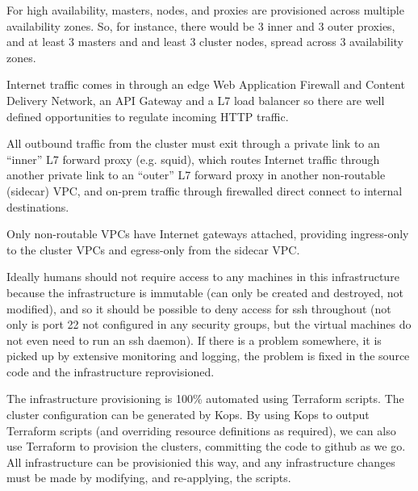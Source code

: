 \documentclass[reprint,amsmath,amssymb,aps]{revtex4-1}
\begin{document}
For high availability, masters, nodes, and proxies are provisioned across multiple availability zones. So, for instance, there would be 3 inner and 3 outer proxies, and at least 3 masters and and least 3 cluster nodes, spread across 3 availability zones.

Internet traffic comes in through an edge Web Application Firewall and Content Delivery Network, an API Gateway and a L7 load balancer so there are well defined opportunities to regulate incoming HTTP traffic.

All outbound traffic from the cluster must exit through a private link to an “inner” L7 forward proxy (e.g. squid), which routes Internet traffic through another private link to an “outer” L7 forward proxy in another non-routable (sidecar) VPC, and on-prem traffic through firewalled direct connect to internal destinations.

Only non-routable VPCs have Internet gateways attached, providing ingress-only to the cluster VPCs and egress-only from the sidecar VPC.

Ideally humans should not require access to any machines in this infrastructure because the infrastructure is immutable (can only be created and destroyed, not modified), and so it should be possible to deny access for ssh throughout (not only is port 22 not configured in any security groups, but the virtual machines do not even need to run an ssh daemon). If there is a problem somewhere, it is picked up by extensive monitoring and logging, the problem is fixed in the source code and the infrastructure reprovisioned.

The infrastructure provisioning is 100\% automated using Terraform scripts. The cluster configuration can be generated by Kops. By using Kops to output Terraform scripts (and overriding resource definitions as required), we can also use Terraform to provision the clusters, committing the code to github as we go. All infrastructure can be provisionied this way, and any infrastructure changes must be made by modifying, and re-applying, the scripts.


\end{document}
